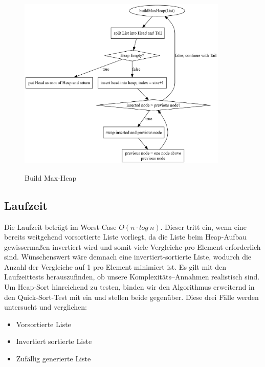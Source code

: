 \documentclass[11pt]{article}
\begin{document}
    \begin{figure}[hbt]
        \caption{Build Max-Heap}
        \centering
        \includegraphics[width = 10cm]{buildMaxHeap.pdf}\label{fig:buildMaxHeap}
    \end{figure}

    \subsection{Laufzeit}\label{subsec:Hlaufzeit}
    Die Laufzeit beträgt im Worst-Case \(O(n\cdot log\ n)\). Dieser tritt
    ein, wenn eine bereits weitgehend vorsortierte Liste vorliegt, da die
    Liste beim Heap-Aufbau gewissermaßen invertiert wird und somit viele
    Vergleiche pro Element erforderlich sind.
    Wünschenswert wäre demnach eine invertiert-sortierte Liste, wodurch die
    Anzahl der Vergleiche auf 1 pro Element minimiert ist.
    Es gilt mit den Laufzeittests herauszufinden, ob unsere
    Komplexitäts--Annahmen realistisch sind.
    Um Heap-Sort hinreichend zu testen, binden wir den Algorithmus erweiternd
    in den Quick-Sort-Test mit ein und stellen beide gegenüber.
    Diese drei Fälle werden untersucht und verglichen:
    \begin{samepage}
        \begin{itemize}
            \item Vorsortierte Liste
            \item Invertiert sortierte Liste
            \item Zufällig generierte Liste
        \end{itemize}
    \end{samepage}
\end{document}
